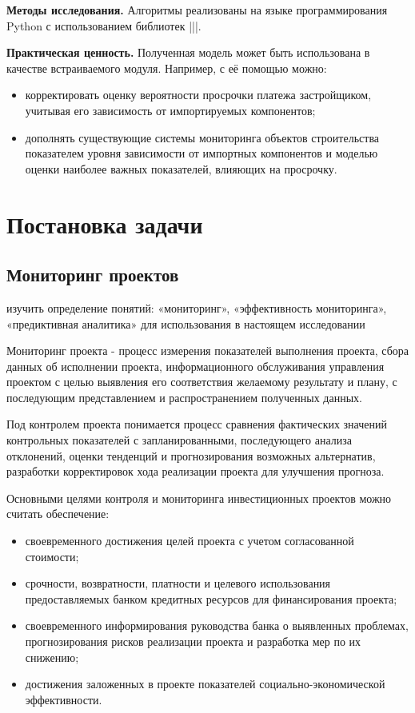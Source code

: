 \documentclass[12pt,a4paper]{article} %
\begin{document}
\bigskip

\textbf{Методы исследования.} Алгоритмы реализованы на языке программирования Python с использованием библиотек |||.

\bigskip

\textbf{Практическая ценность.} Полученная модель может быть использована в качестве встраиваемого модуля. Например, с её помощью можно:
\begin{itemize}
	\item корректировать оценку вероятности просрочки платежа застройщиком, учитывая его зависимость от импортируемых компонентов;
	\item дополнять существующие системы мониторинга объектов строительства показателем уровня зависимости от импортных компонентов и моделью оценки наиболее важных показателей, влияющих на просрочку.
\end{itemize}


\newpage
\section{Постановка задачи}


\subsection{Мониторинг проектов}\label{task}

изучить определение понятий: «мониторинг», «эффективность мониторинга», «предиктивная аналитика» для использования в настоящем исследовании

Мониторинг проекта - процесс измерения показателей выполнения проекта, сбора данных об исполнении проекта, информационного обслуживания управления проектом с целью выявления его соответствия желаемому результату и плану, с последующим представлением и распространением полученных данных.

Под контролем проекта понимается процесс сравнения фактических значений контрольных показателей с запланированными, последующего анализа отклонений, оценки тенденций и прогнозирования возможных альтернатив, разработки корректировок хода реализации проекта для улучшения прогноза.

Основными целями контроля и мониторинга инвестиционных проектов можно считать обеспечение:
\begin{itemize}
	\item своевременного достижения целей проекта с учетом согласованной стоимости;
	\item срочности, возвратности, платности и целевого использования предоставляемых банком кредитных ресурсов для финансирования проекта;
	\item своевременного информирования руководства банка о выявленных проблемах, прогнозирования рисков реализации проекта и разработка мер по их снижению;
	\item достижения заложенных в проекте показателей социально-экономической эффективности.  
\end{itemize}
\end{document}
